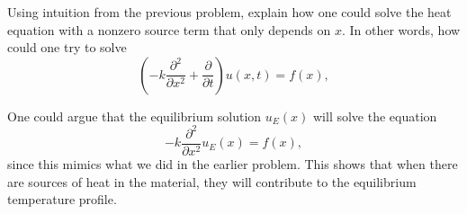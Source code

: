 \documentclass[12pt]{article} %
\begin{document}
\newpage
\begin{problem}
    Using intuition from the previous problem, explain how one could solve the heat equation with a nonzero source term that only depends on $x$. In other words, how could one try to solve
    \[
    \left( -k \frac{\partial^2}{\partial x^2} + \frac{\partial}{\partial t} \right) u(x,t) = f(x),
    \]
\end{problem}
\begin{solution}
One could argue that the equilibrium solution $u_E(x)$ will solve the equation
\[
-k\frac{\partial^2}{\partial x^2} u_E(x) = f(x),
\]
since this mimics what we did in the earlier problem.  This shows that when there are sources of heat in the material, they will contribute to the equilibrium temperature profile.  
\end{solution}

\newpage
\end{document}
